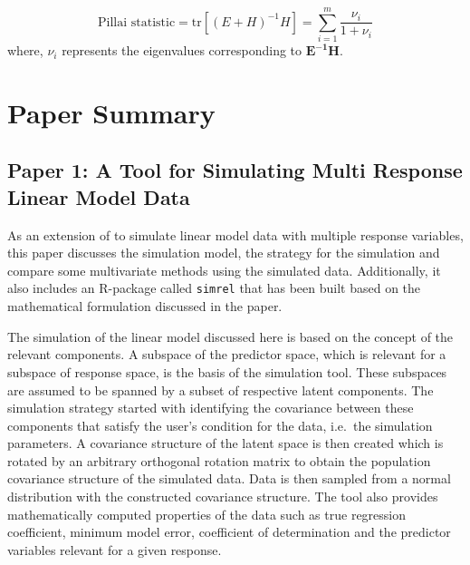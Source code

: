 \documentclass[11pt,twoside,openright,titlepage,
  headinclude,footinclude,BCOR=5mm,
  numbers=noenddot,cleardoublepage=empty,
  tablecaptionabove, dottedtoc,
  bibliography=totoc,paper=a4]{scrreprt}
\begin{document}
\begin{equation}
\text{Pillai statistic} = \text{tr}\left[(E + H)^{-1}H\right] = \sum_{i=1}^{m}{\frac{\nu_i}{1+\nu_i}}
\label{eq:pillai}
\end{equation}
where, \(\nu_i\) represents the eigenvalues corresponding to \(\mathbf{E^{-1}H}\).

\hypertarget{paper-summary}{%
\chapter{Paper Summary}\label{paper-summary}}

\hypertarget{paper-1-a-tool-for-simulating-multi-response-linear-model-data}{%
\section{Paper 1: A Tool for Simulating Multi Response Linear Model Data}\label{paper-1-a-tool-for-simulating-multi-response-linear-model-data}}

As an extension of \citep{saebo2015simrel} to simulate linear model data with multiple response variables, this paper discusses the simulation model, the strategy for the simulation and compare some multivariate methods using the simulated data. Additionally, it also includes an R-package called \texttt{simrel} that has been built based on the mathematical formulation discussed in the paper.

The simulation of the linear model discussed here is based on the concept of the relevant components. A subspace of the predictor space, which is relevant for a subspace of response space, is the basis of the simulation tool. These subspaces are assumed to be spanned by a subset of respective latent components. The simulation strategy started with identifying the covariance between these components that satisfy the user's condition for the data, i.e.~the simulation parameters. A covariance structure of the latent space is then created which is rotated by an arbitrary orthogonal rotation matrix to obtain the population covariance structure of the simulated data. Data is then sampled from a normal distribution with the constructed covariance structure. The tool also provides mathematically computed properties of the data such as true regression coefficient, minimum model error, coefficient of determination and the predictor variables relevant for a given response.
\end{document}
